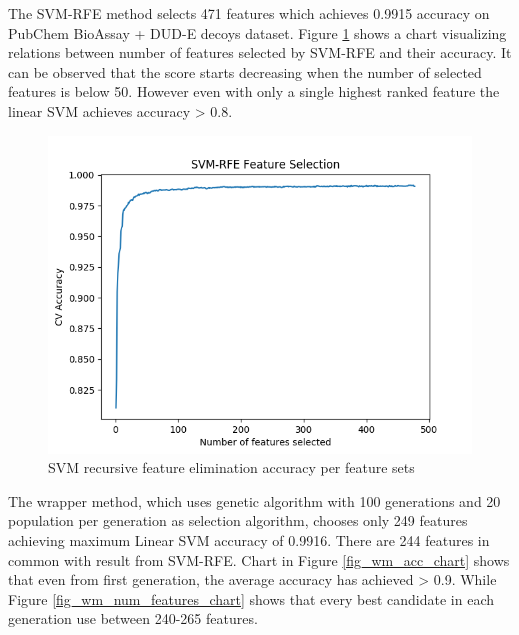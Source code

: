 \documentclass[conference,compsoc,12pt]{IEEEtran}
\begin{document}
	The SVM-RFE method selects 471 features which achieves 0.9915 accuracy on PubChem BioAssay + DUD-E decoys dataset. Figure \ref{fig_svmrfe_acc_num_features_chart} shows a chart visualizing relations between number of features selected by SVM-RFE and their accuracy. It can be observed that the score starts decreasing when the number of selected features is below 50. However even with only a single highest ranked feature the linear SVM achieves accuracy > 0.8.
		
	\begin{figure}
		\includegraphics[scale=0.5]{../images/SVM_RFE_chart.png}
		\caption{SVM recursive feature elimination accuracy per feature sets}
		\label{fig_svmrfe_acc_num_features_chart}
	\end{figure}
	
	The wrapper method, which uses genetic algorithm with 100 generations and 20 population per generation as selection algorithm, chooses only 249 features achieving maximum Linear SVM accuracy of 0.9916. There are 244 features in common with result from SVM-RFE. Chart in Figure \ref{fig_wm_acc_chart} shows that even from first generation, the average accuracy has achieved > 0.9. While Figure \ref{fig_wm_num_features_chart} shows that every best candidate in each generation use between 240-265 features.
		
\end{document}
